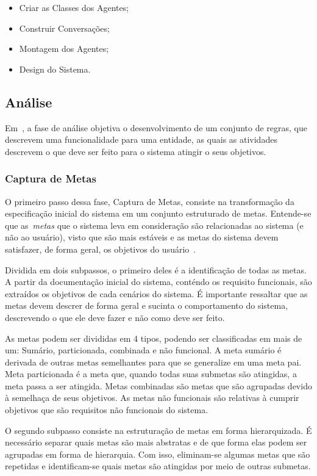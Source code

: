 \begin{itemize}
	\item Criar as Classes dos Agentes;
	\item Construir Conversações;
	\item Montagem dos Agentes;
	\item Design do Sistema.
\end{itemize}

\subsection{Análise}

Em~\cite{scott01}, a fase de análise objetiva o desenvolvimento de um conjunto de regras, que descrevem uma funcionalidade para uma entidade, as quais as atividades descrevem o que deve ser feito para o sistema atingir o seus objetivos.

\subsubsection{Captura de Metas}

O primeiro passo dessa fase, Captura de Metas, consiste na transformação da especificação inicial do sistema em um conjunto estruturado de metas. Entende-se que as~\emph{metas} que o sistema leva em consideração são relacionadas ao sistema (e não ao usuário), visto que são mais estáveis e as metas do sistema devem satisfazer, de forma geral, os objetivos do usuário~\cite{scott01}.

Dividida em dois subpassos, o primeiro deles é a identificação de todas as metas. A partir da documentação inicial do sistema, conténdo os requisito  funcionais, são extraídos os objetivos de cada cenários do sistema. É importante ressaltar que as metas devem descrer de forma geral e sucinta o comportamento do sistema, descrevendo o que ele deve fazer e não como deve ser feito.

As metas podem ser divididas em 4 tipos, podendo ser classificadas em mais de um: Sumário, particionada, combinada e não funcional. A meta sumário é derivada de outras metas semelhantes para que se generalize em uma meta pai. Meta particionada é a meta que, quando todas suas submetas são atingidas,  a meta passa a ser atingida. Metas combinadas são metas que são agrupadas devido à semelhaça de seus objetivos. As metas não funcionais são relativas à cumprir objetivos que são requisitos não funcionais do sistema.

O segundo subpasso consiste na estruturação de metas em forma hierarquizada. É necessário separar quais metas são mais abstratas e de que forma elas podem ser agrupadas em forma de hierarquia. Com isso, eliminam-se algumas metas que são repetidas e identificam-se quais metas são atingidas por meio de outras submetas.

